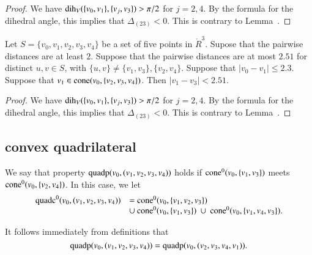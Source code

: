 \begin{proof}
We have $\operatorname{dih}_V(\{v_0,v_1\},\{v_j,v_3\})>\pi/2$ for $j=2,4$.
  By the formula for the dihedral angle, this
implies that $\Delta_{(23)}<0$.  This is contrary to Lemma~.
\end{proof}
\newpage


\newpage

\begin{lemma}
Let $S=\{v_0,v_1,v_2,v_3,v_4\}$ be a set of
five points in $\ring{R}^3$.  Supose that the pairwise
distances are at least $2$.  Suppose that the pairwise
distances are at most $2.51$ for distinct $u,v\in S$, with
$\{u,v\}\ne \{v_1,v_3\}, \{v_2,v_4\}$.  Suppose that $|v_0-v_1|\le 2.3$.
Suppose that $v_1\in{\operatorname{cone}}(v_0,\{v_2,v_3,v_4\})$.
Then $|v_1-v_3|< 2.51$.  
\end{lemma}

\begin{proof}
We have $\operatorname{dih}_V(\{v_0,v_1\},\{v_j,v_3\})>\pi/2$ for $j=2,4$.
  By the formula for the dihedral angle, this
implies that $\Delta_{(23)}<0$.  This is contrary to Lemma~.
\end{proof}



\newpage

\subsection{convex quadrilateral}

\begin{definition}
We say that property ${\operatorname{quadp}}(v_0,(v_1,v_2,v_3,v_4))$  holds if
${\operatorname{cone}}^0(v_0,\{v_1,v_3\})$ meets ${\operatorname{cone}}^0(v_0,\{v_2,v_4\})$.
In this case, we let 
 $$\begin{array}{lll}
   \op{quadc}^0(v_0,(v_1,v_2,v_3,v_4))&= 
    \op{cone}^0(v_0,\{v_1,v_2,v_3\})  \\
    &\cup \ \op{cone}^0(v_0,\{v_1,v_3\})\ \cup \ 
   \op{cone}^0(v_0,\{v_1,v_4,v_3\}).
  \end{array}$$
\end{definition}

It follows immediately from definitions that
  $${\operatorname{quadp}}(v_0,(v_1,v_2,v_3,v_4))={\operatorname{quadp}}(v_0,(v_2,v_3,v_4,v_1)).$$

